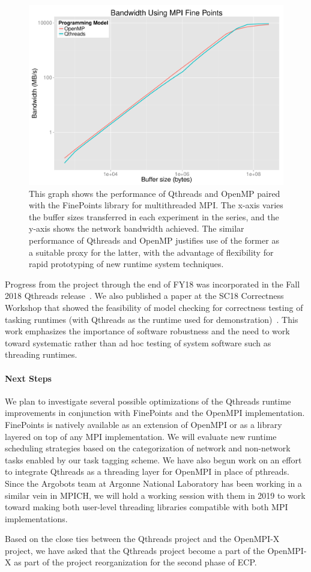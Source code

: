 \begin{figure}[htb]
	\centering
	\includegraphics[width=6in]{projects/2.3.1-PMR/2.3.1.17-OMPI-X/FinePointsBW-QtOmp.pdf}
	\caption{\label{fig:qthreads-finepoints-graph}This graph shows the performance of Qthreads and OpenMP paired with the FinePoints library for multithreaded MPI.  The x-axis varies the buffer sizes transferred in each experiment in the series, and the y-axis shows the network bandwidth achieved.  The similar performance of Qthreads and OpenMP justifies use of the former as a suitable proxy for the latter, with the advantage of flexibility for rapid prototyping of new runtime system techniques.}
\end{figure}

Progress from the project through the end of FY18 was incorporated in the Fall 2018 Qthreads release~\cite{qthreads-github}.  We also published a paper at the SC18 Correctness Workshop that showed the feasibility of model checking for correctness testing of tasking runtimes (with Qthreads as the runtime used for demonstration)~\cite{evans2018qthreads-model}.  This work emphasizes the importance of software robustness and the need to work toward systematic rather than ad hoc testing of system software such as threading runtimes.

\paragraph{Next Steps}

We plan to investigate several possible optimizations of the Qthreads runtime improvements in conjunction with FinePoints and the OpenMPI implementation. FinePoints is natively available as an extension of OpenMPI or as a library layered on top of any MPI implementation. We will evaluate new runtime scheduling strategies based on the categorization of network and non-network tasks enabled by our task tagging scheme. We have also begun work on an effort to integrate Qthreads as a threading layer for OpenMPI in place of pthreads. Since the Argobots team at Argonne National Laboratory has been working in a similar vein in MPICH, we will hold a working session with them in 2019 to work toward making both user-level threading libraries compatible with both MPI implementations.

Based on the close ties between the Qthreads project and the OpenMPI-X project, we have asked that the Qthreads project become a part of the OpenMPI-X as part of the project reorganization for the second phase of ECP.

